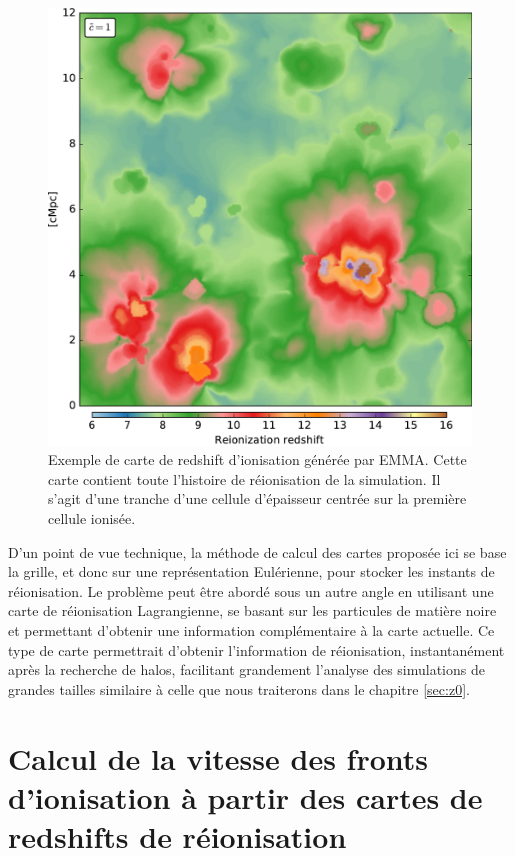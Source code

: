 \begin{figure}
        \includegraphics[width=.95\linewidth]{img/04_mapreio/map_z_c1.pdf} 
        \caption[Carte de redshift d'ionisation]{Exemple de carte de redshift d'ionisation générée par EMMA.
        Cette carte contient toute l'histoire de réionisation de la simulation.
        Il s'agit d'une tranche d'une cellule d'épaisseur centrée sur la première cellule ionisée.
 		\label{fig:zmap}}
\end{figure}

D'un point de vue technique, la méthode de calcul des cartes proposée ici se base la grille, et donc sur une représentation Eulérienne, pour stocker les instants de réionisation.
Le problème peut être abordé sous un autre angle en utilisant une carte de réionisation Lagrangienne, se basant sur les particules de matière noire et permettant d'obtenir une information complémentaire à la carte actuelle.
Ce type de carte permettrait d'obtenir l'information de réionisation, instantanément après la recherche de halos, facilitant grandement l'analyse des simulations de grandes tailles similaire à celle que nous traiterons dans le chapitre \ref{sec:z0}.

\section{Calcul de la vitesse des fronts d’ionisation à partir des cartes de redshifts de réionisation}
\label{sec:vreio}

